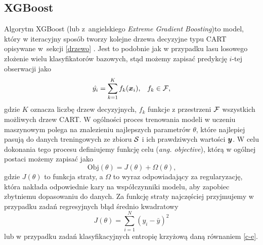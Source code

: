 \documentclass[inzynierska]{pwr_wmat_praca_dyplomowa}
\theoremstyle{plain}
\numberwithin{theorem}{chapter}
\theoremstyle{definition}
\numberwithin{theorem}{chapter}
\begin{document}
\subsection{XGBoost}
Algorytm XGBoost (lub z~angielskiego \textit{Extreme Gradient Boosting})to model, który w iteracyjny sposób tworzy kolejne drzewa decyzyjne typu CART opisywane w~sekcji \ref{drzewo} \cite{xgboost}. Jest to podobnie jak w przypadku lasu losowego złożenie wielu klasyfikatorów bazowych, stąd możemy zapisać predykcję $i$-tej obserwacji jako
$$ \hat{y_i} = \sum_{k=1}^K f_k(\boldsymbol{x}_i) \text{,} \quad f_k \in \mathcal{F} \text{,} $$
gdzie $K$ oznacza liczbę drzew decyzyjnych, $f_k$ funkcje z przestrzeni $\mathcal{F}$ wszystkich możliwych drzew CART.
W ogólności proces trenowania modeli w uczeniu maszynowym polega na znalezieniu najlepszych parametrów $\theta$, które najlepiej pasują do danych treningowych ze zbioru $\mathcal{S}$ i ich prawdziwych wartości $\boldsymbol{y}$. W celu dokonania tego procesu definiujemy funkcję celu (\textit{ang. objective}), którą w ogólnej postaci możemy zapisać jako
$$ \text{Obj}(\theta) = J(\theta) + \Omega(\theta) \text{,}$$
gdzie $J(\theta)$ to funkcja straty, a $\Omega$ to wyraz odpowiadający za regularyzację, która nakłada odpowiednie kary na współczynniki modelu, aby zapobiec zbytniemu dopasowaniu do danych. Za funkcję straty najczęściej przyjmujemy w przypadku zadań regresyjnych błąd średnio kwadratowy
$$ J(\theta) = \sum_{i=1}^{N} (y_i - \bar{y})^2 $$
lub w przypadku zadań klasyfikacyjnych entropię krzyżową daną równaniem \ref{c-e}.
\end{document}
